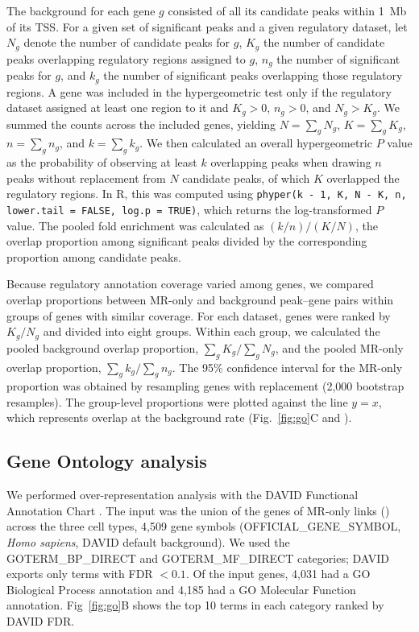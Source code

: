 \noindent The background for each gene $g$ consisted of all its candidate peaks within 1~Mb of its TSS. For a given set of significant peaks and a given regulatory dataset, let $N_g$ denote the number of candidate peaks for $g$, $K_g$ the number of candidate peaks overlapping regulatory regions assigned to $g$, $n_g$ the number of significant peaks for $g$, and $k_g$ the number of significant peaks overlapping those regulatory regions. A gene was included in the hypergeometric test only if the regulatory dataset assigned at least one region to it and $K_g>0$, $n_g>0$, and $N_g>K_g$. We summed the counts across the included genes, yielding $N=\sum_g N_g$, $K=\sum_g K_g$, $n=\sum_g n_g$, and $k=\sum_g k_g$. We then calculated an overall hypergeometric $P$ value as the probability of observing at least $k$ overlapping peaks when drawing $n$ peaks without replacement from $N$ candidate peaks, of which $K$ overlapped the regulatory regions. In R, this was computed using \texttt{phyper(k - 1, K, N - K, n, lower.tail = FALSE, log.p = TRUE)}, which returns the log-transformed $P$ value. The pooled fold enrichment was calculated as $(k/n)/(K/N)$, the overlap proportion among significant peaks divided by the corresponding proportion among candidate peaks.

\noindent Because regulatory annotation coverage varied among genes, we compared overlap proportions between MR-only and background peak--gene pairs within groups of genes with similar coverage. For each dataset, genes were ranked by $K_g/N_g$ and divided into eight groups. Within each group, we calculated the pooled background overlap proportion, $\sum_g K_g/\sum_g N_g$, and the pooled MR-only overlap proportion, $\sum_g k_g/\sum_g n_g$. The 95\% confidence interval for the MR-only proportion was obtained by resampling genes with replacement (2,000 bootstrap resamples). The group-level proportions were plotted against the line $y=x$, which represents overlap at the background rate (Fig.~\ref{fig:go}C and ).


\subsection{Gene Ontology analysis}
\label{sec:go}
We performed over-representation analysis with the DAVID Functional Annotation Chart \cite{sherman2022david}. The input was the union of the genes of MR-only links () across the three cell types, 4,509 gene symbols (OFFICIAL\_GENE\_SYMBOL, \textit{Homo sapiens}, DAVID default background). We used the GOTERM\_BP\_DIRECT and GOTERM\_MF\_DIRECT categories; DAVID exports only terms with FDR $<0.1$. Of the input genes, 4,031 had a GO Biological Process annotation and 4,185 had a GO Molecular Function annotation. Fig~\ref{fig:go}B shows the top 10 terms in each category ranked by DAVID FDR. 


